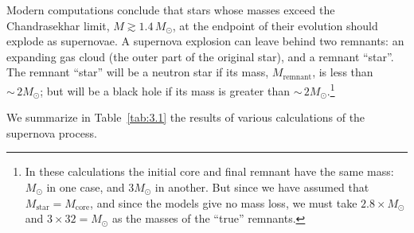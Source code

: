 Modern computations conclude that stars whose masses exceed the
Chandrasekhar limit, $M\gtrsim 1.4\,M_\odot$, at the endpoint of their evolution should
explode as supernovae.  A supernova explosion can leave behind two remnants: an
expanding gas cloud (the outer part of the original star), and a remnant ``star''.
The remnant ``star'' will be a neutron star if its mass, $M_{\text{remnant}}$, is less
than ${\sim}\,2M_\odot$; but will be a black hole if its mass is greater than
${\sim}\,2M_\odot$.\footnote{In these calculations the initial core and final remnant
have the same mass: $M_\odot$ in one case, and $3M_\odot$ in another.
But since we have assumed that $M_{\text{star}} = M_{\text{core}}$, and since the models
give no mass loss, we must take $2.8\times M_\odot$ and $3\times 32 = M_\odot$ as the
masses of the ``true'' remnants.}

We summarize in Table~\ref{tab:3.1} the results of various calculations of the
supernova process.


